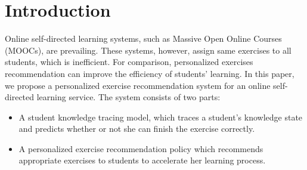 \documentclass{edm_template}
\begin{document}
\begin{abstract}
\end{abstract}

\section{Introduction}


Online self-directed learning systems, such as Massive Open Online Courses (MOOCs), are prevailing. These systems, however, assign same exercises to all students, which is inefficient. For comparison, personalized exercises recommendation can improve the efficiency of students' learning. In this paper, we propose a personalized exercise recommendation system for an online self-directed learning service. The system consists of two parts:
\begin{itemize}
	\item A student knowledge tracing model, which traces a student's knowledge state and predicts whether or not she can finish the exercise correctly.
	\item A personalized exercise recommendation policy which recommends appropriate exercises to students to accelerate her learning process.
\end{itemize}
\end{document}
